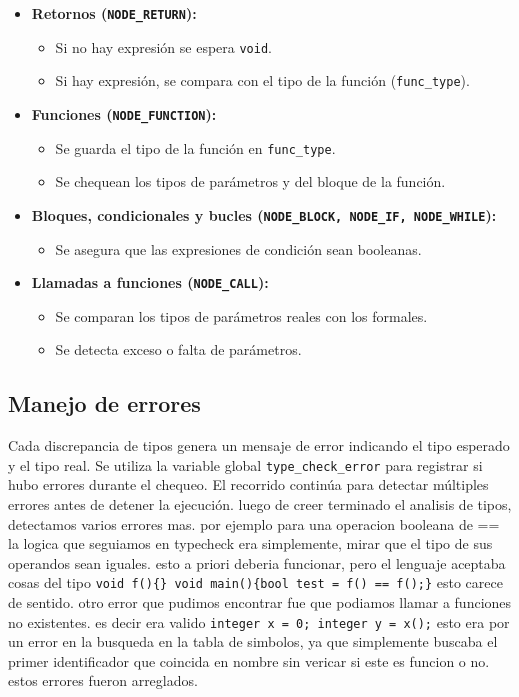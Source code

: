 \documentclass[12pt,a4paper]{article}
\begin{document}
\begin{itemize}
    \item \textbf{Retornos (\texttt{NODE\_RETURN}):}
        \begin{itemize}
            \item Si no hay expresión se espera \texttt{void}.
            \item Si hay expresión, se compara con el tipo de la función (\texttt{func\_type}).
        \end{itemize}

    \item \textbf{Funciones (\texttt{NODE\_FUNCTION}):}
        \begin{itemize}
            \item Se guarda el tipo de la función en \texttt{func\_type}.
            \item Se chequean los tipos de parámetros y del bloque de la función.
        \end{itemize}

    \item \textbf{Bloques, condicionales y bucles (\texttt{NODE\_BLOCK, NODE\_IF, NODE\_WHILE}):}
        \begin{itemize}
            \item Se asegura que las expresiones de condición sean booleanas.
        \end{itemize}

    \item \textbf{Llamadas a funciones (\texttt{NODE\_CALL}):}
        \begin{itemize}
            \item Se comparan los tipos de parámetros reales con los formales.
            \item Se detecta exceso o falta de parámetros.
        \end{itemize}
\end{itemize}

\subsection{Manejo de errores}
Cada discrepancia de tipos genera un mensaje de error indicando el tipo esperado y el tipo real. Se utiliza la variable global \texttt{type\_check\_error} para registrar si hubo errores durante el chequeo.  
El recorrido continúa para detectar múltiples errores antes de detener la ejecución.
luego de creer terminado el analisis de tipos, detectamos varios errores mas. por ejemplo para una operacion booleana de == la logica que seguiamos en typecheck era simplemente, mirar que el tipo de sus operandos sean iguales. esto a priori deberia funcionar, pero el lenguaje aceptaba cosas del tipo \texttt{void f()\{\} void main()\{bool test = f() == f();\}} esto carece de sentido. otro error que pudimos encontrar fue que podiamos llamar a funciones no existentes. es decir era valido \texttt{integer x = 0; integer y = x();} esto era por un error en la busqueda en la tabla de simbolos, ya que simplemente buscaba el primer identificador que coincida en nombre sin vericar si este es funcion o no. estos errores fueron arreglados.
\end{document}
